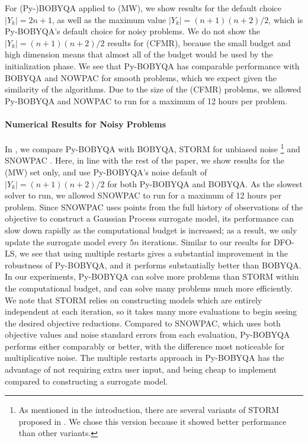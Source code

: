 For (Py-)BOBYQA applied to (MW), we show results for the default choice $|Y_k|=2n+1$, as well as the maximum value $|Y_k|=(n+1)(n+2)/2$, which is Py-BOBYQA's default choice for noisy problems.
We do not show the $|Y_k|=(n+1)(n+2)/2$ results for (CFMR), because the small budget and high dimension means that almost all of the budget would be used by the initialization phase.
We see that Py-BOBYQA has comparable performance with BOBYQA and NOWPAC for smooth problems, which we expect given the similarity of the algorithms.
Due to the size of the (CFMR) problems, we allowed Py-BOBYQA and NOWPAC to run for a maximum of 12 hours per problem.

\paragraph{Numerical Results for Noisy Problems} In , we compare Py-BOBYQA with BOBYQA, STORM for unbiased noise \cite{Chen2016}\footnote{\:As mentioned in the introduction, there are several variants of STORM proposed in \cite{Chen2016}. We chose this version because it showed better performance than other variants.} and SNOWPAC \cite{Augustin2017}.
Here, in line with the rest of the paper, we show results for the (MW) set only, and use Py-BOBYQA's noise default of $|Y_k|=(n+1)(n+2)/2$ for both Py-BOBYQA and BOBYQA.
As the slowest solver to run, we allowed SNOWPAC to run for a maximum of 12 hours per problem.
Since SNOWPAC uses points from the full history of observations of the objective to construct a Gaussian Process surrogate model, its performance can slow down rapidly as the computational budget is increased; as a result, we only update the surrogate model every $5n$ iterations.
Similar to our results for DFO-LS, we see that using multiple restarts gives a substantial improvement in the robustness of Py-BOBYQA, and it performs substantially better than BOBYQA.
In our experiments, Py-BOBYQA can solve more problems than STORM within the computational budget, and can solve many problems much more efficiently.
We note that STORM relies on constructing models which are entirely independent at each iteration, so it takes many more evaluations to begin seeing the desired objective reductions.
Compared to SNOWPAC, which uses both objective values and noise standard errors from each evaluation, Py-BOBYQA performs either comparably or better, with the difference most noticeable for multiplicative noise.
The multiple restarts approach in Py-BOBYQA has the advantage of not requiring extra user input, and being cheap to implement compared to constructing a surrogate model.

